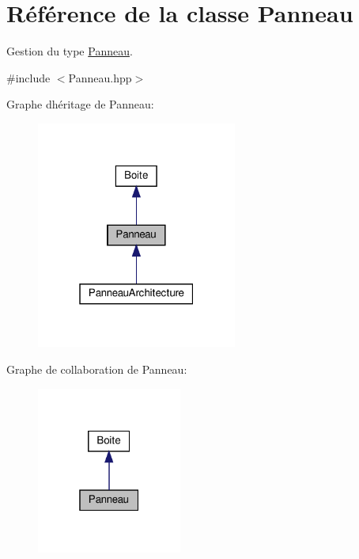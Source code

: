 \hypertarget{class_panneau}{}\section{Référence de la classe Panneau}
\label{class_panneau}


Gestion du type \hyperlink{class_panneau}{Panneau}.  




{\ttfamily \#include $<$Panneau.\+hpp$>$}



Graphe d\textquotesingle{}héritage de Panneau\+:\nopagebreak
\begin{figure}[H]
\begin{center}
\leavevmode
\includegraphics[width=187pt]{class_panneau__inherit__graph}
\end{center}
\end{figure}


Graphe de collaboration de Panneau\+:\nopagebreak
\begin{figure}[H]
\begin{center}
\leavevmode
\includegraphics[width=135pt]{class_panneau__coll__graph}
\end{center}
\end{figure}
